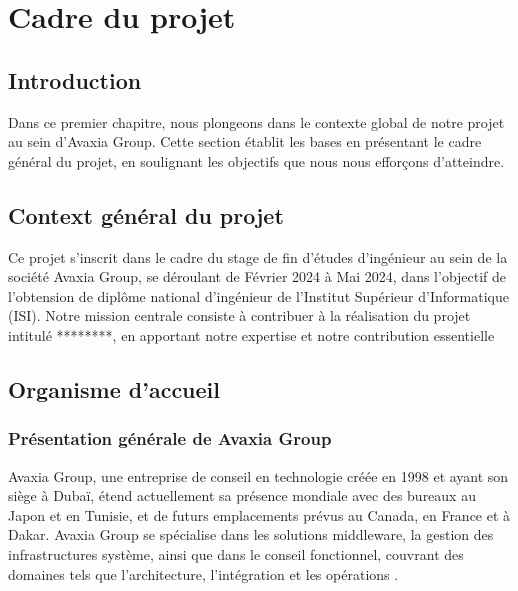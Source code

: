\chapter{Cadre du projet}
\section*{Introduction}
Dans ce premier chapitre, nous plongeons dans le contexte global de notre projet au sein d'Avaxia Group. Cette section établit les bases en présentant le cadre général du projet, en soulignant les objectifs que nous nous efforçons d'atteindre.


\section{Context général du projet}
\par Ce projet s'inscrit dans le cadre du stage de fin d'études d'ingénieur au sein de la société Avaxia Group, se déroulant de Février 2024 à Mai 2024, dans l'objectif de l'obtension de diplôme national d'ingénieur de l'Institut Supérieur d'Informatique (ISI). 
Notre mission centrale consiste à contribuer à la réalisation du projet intitulé ********, en apportant notre expertise et notre contribution essentielle
\section[Organisme d'accueil]{Organisme d'accueil}
\subsection{Présentation générale de Avaxia Group}
\par Avaxia Group, une entreprise de conseil en technologie créée en 1998 et ayant son siège à Dubaï, étend actuellement sa présence mondiale avec des bureaux au Japon et en Tunisie, et de futurs emplacements prévus au Canada, en France et à Dakar. Avaxia Group se spécialise dans les solutions middleware, la gestion des infrastructures système, ainsi que dans le conseil fonctionnel, couvrant des domaines tels que l'architecture, l'intégration et les opérations \cite{avaxia}.
